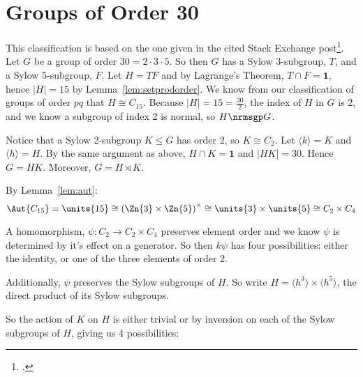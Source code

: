 \section{Groups of Order 30}
This classification is based on the one given in the cited Stack Exchange post\footcite{order30}.
Let \(G\) be a group of order \(30 = 2 \cdot 3 \cdot 5\).
So then \(G\) has a Sylow 3-subgroup, \(T\), and a Sylow 5-subgroup, \(F\).
Let \(H = TF\) and by Lagrange's Theorem, \(T \cap F = \bm{1}\), hence \(|H| = 15\) by Lemma~\ref{lem:setprodorder}.
We know from our classification of groups of order \(pq\) that \(H \cong C_{15}\).
Because \(|H| = 15 = \frac{30}{2}\), the index of \(H\) in \(G\) is 2, and we know a subgroup of index 2 is normal, so \(H \nrmsgp G\).

Notice that a Sylow 2-subgroup \(K \leqslant G\) has order 2, so \(K \cong C_2\).
Let \(\langle k \rangle = K\) and \(\langle h \rangle = H\).
By the same argument as above, \(H \cap K = \bm{1}\) and \(|HK| = 30\).
Hence \(G = HK\).
Moreover, \(G = H \rtimes K\).

By Lemma~\ref{lem:aut}:
\[\Aut{C_{15}} = \units{15} \cong {(\Zn{3} \times \Zn{5})}^\times \cong \units{3} \times \units{5} \cong C_2 \times C_4\]

A homomorphism, \(\psi:C_2 \to C_2 \times C_4\) preserves element order and we know \(\psi\) is determined by it's effect on a generator.
So then \(k\psi\) has four possibilities: either the identity, or one of the three elements
of order 2.

Additionally, \(\psi\) preserves the Sylow subgroups of \(H\).
So write \(H = \langle h^3 \rangle \times \langle h^5 \rangle\), the direct product of its Sylow subgroups.

So the action of \(K\) on \(H\) is either trivial or by inversion on each of the Sylow subgroups of \(H\), giving us 4
possibilities:

